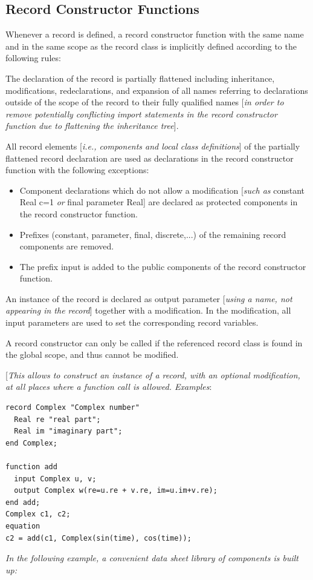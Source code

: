 \documentclass[10pt,a4paper]{report}
\def\doublelabel#1{\label{#1}\hypertarget{#1}{}}
\begin{document}
\subsection{Record Constructor Functions}\doublelabel{record-constructor-functions}

Whenever a record is defined, a record constructor function with the
same name and in the same scope as the record class is implicitly
defined according to the following rules:

The declaration of the record is partially flattened including
inheritance, modifications, redeclarations, and expansion of all names
referring to declarations outside of the scope of the record to their
fully qualified names {[}\emph{in order to remove potentially
conflicting import statements in the record constructor function due to
flattening the inheritance tree}{]}.

All record elements {[}\emph{i.e., components and local class
definitions}{]} of the partially flattened record declaration are used
as declarations in the record constructor function with the following
exceptions:

\begin{itemize}
\item
  Component declarations which do not allow a modification {[}\emph{such
  as} constant Real c=1 \emph{or} final parameter Real{]} are declared
  as protected components in the record constructor function.
\item
  Prefixes (constant, parameter, final, discrete,...) of the remaining
  record components are removed.
\item
  The prefix input is added to the public components of the record
  constructor function.
\end{itemize}

An instance of the record is declared as output parameter {[}\emph{using
a name, not appearing in the record}{]} together with a modification. In
the modification, all input parameters are used to set the corresponding
record variables.

A record constructor can only be called if the referenced record class
is found in the global scope, and thus cannot be modified.

{[}\emph{This allows to construct an instance of a record, with an
optional modification, at all places where a function call is allowed.
Examples}:

\begin{lstlisting}[language=modelica]
record Complex "Complex number"
  Real re "real part";
  Real im "imaginary part";
end Complex;

function add
  input Complex u, v;
  output Complex w(re=u.re + v.re, im=u.im+v.re);
end add;
Complex c1, c2;
equation
c2 = add(c1, Complex(sin(time), cos(time));
\end{lstlisting}
\emph{In the following example, a convenient data sheet library of
components is built up:}
\end{document}
